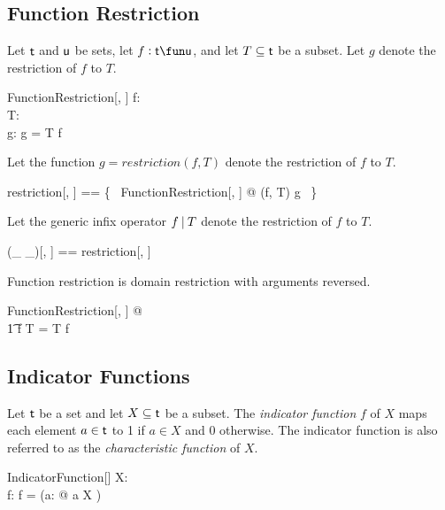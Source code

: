 \documentclass{amsart}
\begin{document}
\subsection{Function Restriction}

Let $\mathsf{t}$ and $\mathsf{u}$ be sets, let $f: \genT \fun \genU$, and let $T \subseteq \mathsf{t}$ be a subset.
Let $g$ denote the restriction of $f$ to $T$.

\begin{schema}{FunctionRestriction}[\genT, \genU]
	f: \genT \fun \genU \\
	T: \power \genT \\
	g: \genT \pfun \genU
\where
	g = T \dres f
\end{schema}

Let the function  $g = restriction(f, T)$ denote the restriction of $f$ to $T$.

\begin{zed}
	restriction[\genT, \genU] == \{~ FunctionRestriction[\genT, \genU] @ (f, T) \mapsto g ~\}
\end{zed}

Let the generic infix operator $f \mathbin{|} T$ denote the restriction of $f$ to $T$.

\begin{zed}
	(\_ \restrictU \_)[\genT, \genU] == restriction[\genT, \genU]
\end{zed}

\begin{remark}
Function restriction is domain restriction with arguments reversed.
\begin{zed}
	\forall FunctionRestriction[\setT, \setU] @ \\
	\t1	f \restrictU T = T \dres f
\end{zed}
\end{remark}

\subsection{Indicator Functions}

Let $\mathsf{t}$ be a set and let $X \subseteq \mathsf{t}$ be a subset.
The \textit{indicator function}  $f$  of $X$ maps each element $a \in \mathsf{t}$ to 1 if $a \in X$ and 0 otherwise.
The indicator function is also referred to as the \textit{characteristic function} of $X$.

\begin{schema}{IndicatorFunction}[\genT]
	X: \power \genT \\
	f: \genT \fun \B
\where
	f = (\lambda a: \genT @ \IF a \in X  )
\end{schema}
\end{document}
